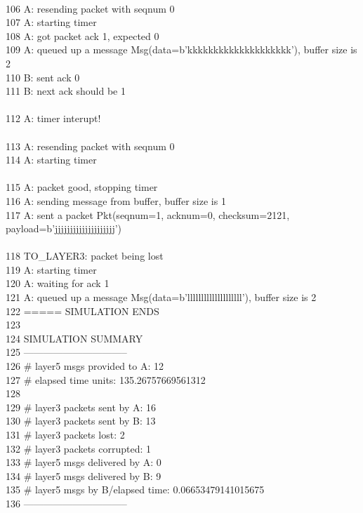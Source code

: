 \documentclass{article}
\begin{document}
{\\
106 A: resending packet with seqnum 0\\
107 A: starting timer\\
108 A: got packet ack 1, expected 0\\
109 A: queued up a message Msg(data=b'kkkkkkkkkkkkkkkkkkkk'), buffer size is 2\\
110 B: sent ack 0\\
111 B: next ack should be 1\\
\\
112 A: timer interupt!\\
\\
113 A: resending packet with seqnum 0\\
114 A: starting timer\\
\\
115 A: packet good, stopping timer\\
116 A: sending message from buffer, buffer size is 1\\
117 A: sent a packet Pkt(seqnum=1, acknum=0, checksum=2121, payload=b'jjjjjjjjjjjjjjjjjjjj')\\
\\
118           \hspace*{10mm} TO\_LAYER3: packet being lost\\
119 A: starting timer\\
120 A: waiting for ack 1\\
121 A: queued up a message Msg(data=b'llllllllllllllllllll'), buffer size is 2\\
122 ===== SIMULATION ENDS\\
123\\
124 SIMULATION SUMMARY\\
125 --------------------------------\\
126 \# layer5 msgs provided to A:      12\\
127 \# elapsed time units:             135.26757669561312\\
128\\
129 \# layer3 packets sent by A:       16\\
130 \# layer3 packets sent by B:       13\\
131 \# layer3 packets lost:            2\\
132 \# layer3 packets corrupted:       1\\
133 \# layer5 msgs delivered by A:     0\\
134 \# layer5 msgs delivered by B:     9\\
135 \# layer5 msgs by B/elapsed time:  0.06653479141015675\\
136 --------------------------------\\
}\\
\end{document}
